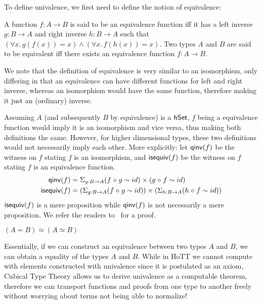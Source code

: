 To define univalence, we first need to define the notion of equivalence:
\begin{definition}[Equivalence]
    A function $f : A \to B$ is said to be an equivalence
    function iff it has a left inverse $g : B \to A$ and right inverse 
    $h : B \to A$ such that
    $(\forall x.\, g(f(x)) = x) \land (\forall x.\, f(h(x)) = x)$. 
    Two types $A$ and $B$ are said to be equivalent iff there exists
    an equivalence function $f : A \to B$. 
\end{definition}

We note that the definition of equivalence is very similar to
an isomorphism, only differing in that an equivalence can have
different functions for left and right inverse, whereas an isomorphism
would have the same function, therefore making it just an (ordinary) inverse.

Assuming $A$ (and subsequently $B$ by equivalence) is a $\mathsf{hSet}$,
$f$ being a equivalence function would imply it is an isomorphism and 
vice versa, thus making both definitions the same. However, for higher
dimensional types, these two definitions would not necessarily imply
each other.
More explicitly: let $\operatorname{\mathsf{qinv}}(f)$
be the witness on $f$
stating $f$ is an isomorphism, and $\operatorname{\mathsf{isequiv}}(f)$ be the witness on
$f$ stating $f$ is an equivalence function.
\begin{align*}
\operatorname{\mathsf{qinv}}(f) & = \Sigma_{g : B \to A}(f \mathrel{\circ} g \sim id)\times(g \mathrel{\circ} f \sim id) \\
\operatorname{\mathsf{isequiv}}(f) & = (\Sigma_{g : B \to A}(f \mathrel{\circ} g \sim id))\times(\Sigma_{h : B \to A}(h \mathrel{\circ} f \sim id))
\end{align*}
$\operatorname{\mathsf{isequiv}}(f)$ is a mere proposition while $\operatorname{\mathsf{qinv}}(f)$ is not
necessarily a mere proposition.
We refer the readers
to~\cite[Chapter 4.1]{univalentfoundationsprogramHomotopyTypeTheory2013} for a proof.

\begin{definition}
    $(A = B) \simeq (A \simeq B)$
\end{definition}
Essentially, if we can construct an equivalence between two types $A$ and $B$,
we can obtain a equality of the types $A$ and $B$. While in HoTT we cannot
compute with elements constructed with univalence since it is postulated as an
axiom, Cubical Type Theory allows us to derive univalence as a computable
theorem, therefore we can transport functions and proofs from one type to
another freely without worrying about terms not being able to normalize!

